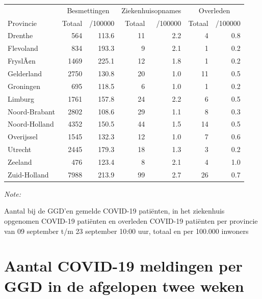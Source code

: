 \documentclass[
  english,
  man,floatsintext]{apa6}
\begin{document}
\begin{table}
\centering
\begin{threeparttable}
\begin{tabular}{lrrrrrr}
\toprule
\multicolumn{1}{c}{ } & \multicolumn{2}{c}{Besmettingen} & \multicolumn{2}{c}{Ziekenhuisopnames} & \multicolumn{2}{c}{Overleden} \\
\cmidrule(l{3pt}r{3pt}){2-3} \cmidrule(l{3pt}r{3pt}){4-5} \cmidrule(l{3pt}r{3pt}){6-7}
Provincie & Totaal & /100000 & Totaal & /100000 & Totaal & /100000\\
\midrule
Drenthe & 564 & 113.6 & 11 & 2.2 & 4 & 0.8\\
Flevoland & 834 & 193.3 & 9 & 2.1 & 1 & 0.2\\
FryslÃ¢n & 1469 & 225.1 & 12 & 1.8 & 1 & 0.2\\
Gelderland & 2750 & 130.8 & 20 & 1.0 & 11 & 0.5\\
Groningen & 695 & 118.5 & 6 & 1.0 & 1 & 0.2\\
Limburg & 1761 & 157.8 & 24 & 2.2 & 6 & 0.5\\
Noord-Brabant & 2802 & 108.6 & 29 & 1.1 & 8 & 0.3\\
Noord-Holland & 4352 & 150.5 & 44 & 1.5 & 14 & 0.5\\
Overijssel & 1545 & 132.3 & 12 & 1.0 & 7 & 0.6\\
Utrecht & 2445 & 179.3 & 18 & 1.3 & 3 & 0.2\\
Zeeland & 476 & 123.4 & 8 & 2.1 & 4 & 1.0\\
Zuid-Holland & 7988 & 213.9 & 99 & 2.7 & 26 & 0.7\\
\bottomrule
\end{tabular}
\begin{tablenotes}
\item \textit{Note: } 
\item Aantal bij de GGD’en gemelde COVID-19 patiënten, in het ziekenhuis opgenomen COVID-19 patiënten en overleden COVID-19 patiënten per provincie van 09 september t/m 23 september 10:00 uur, totaal en per 100.000 inwoners
\end{tablenotes}
\end{threeparttable}
\end{table}

\newpage

\hypertarget{aantal-covid-19-meldingen-per-ggd-in-de-afgelopen-twee-weken}{%
\section{Aantal COVID-19 meldingen per GGD in de afgelopen twee weken}\label{aantal-covid-19-meldingen-per-ggd-in-de-afgelopen-twee-weken}}
\end{document}

